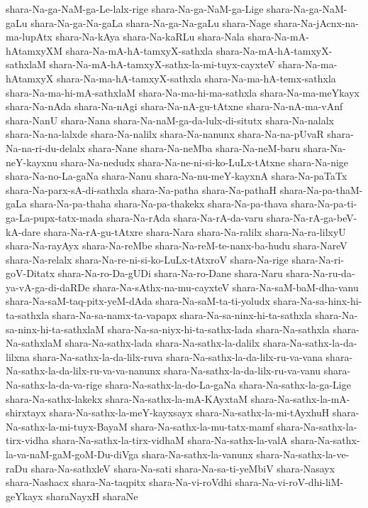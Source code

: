 {shara-Na-ga-NaM-ga-Le-lalx-rige
shara-Na-ga-NaM-ga-Lige
shara-Na-ga-NaM-gaLu
shara-Na-ga-Na-gaLa
shara-Na-ga-Na-gaLu
shara-Nage
shara-Na-jAcnx-na-ma-lupAtx
shara-Na-kAya
shara-Na-kaRLu
shara-Nala
shara-Na-mA-hAtamxyXM
shara-Na-mA-hA-tamxyX-sathxla
shara-Na-mA-hA-tamxyX-sathxlaM
shara-Na-mA-hA-tamxyX-sathx-la-mi-tuyx-cayxteV
shara-Na-ma-hAtamxyX
shara-Na-ma-hA-tamxyX-sathxla
shara-Na-ma-hA-temx-sathxla
shara-Na-ma-hi-mA-sathxlaM
shara-Na-ma-hi-ma-sathxla
shara-Na-ma-meYkayx
shara-Na-nAda
shara-Na-nAgi
shara-Na-nA-gu-tAtxne
shara-Na-nA-ma-vAnf
shara-NanU
shara-Nana
shara-Na-naM-ga-da-lulx-di-situtx
shara-Na-nalalx
shara-Na-na-lalxde
shara-Na-nalilx
shara-Na-nanunx
shara-Na-na-pUvaR
shara-Na-na-ri-du-delalx
shara-Nane
shara-Na-neMba
shara-Na-neM-baru
shara-Na-neY-kayxnu
shara-Na-nedudx
shara-Na-ne-ni-si-ko-LuLx-tAtxne
shara-Na-nige
shara-Na-no-La-gaNa
shara-Nanu
shara-Na-nu-meY-kayxnA
shara-Na-paTaTx
shara-Na-parx-sA-di-sathxla
shara-Na-patha
shara-Na-pathaH
shara-Na-pa-thaM-gaLa
shara-Na-pa-thaha
shara-Na-pa-thakekx
shara-Na-pa-thava
shara-Na-pa-ti-ga-La-pupx-tatx-mada
shara-Na-rAda
shara-Na-rA-da-varu
shara-Na-rA-ga-beV-kA-dare
shara-Na-rA-gu-tAtxre
shara-Nara
shara-Na-ralilx
shara-Na-ra-lilxyU
shara-Na-rayAyx
shara-Na-reMbe
shara-Na-reM-te-nanx-ba-hudu
shara-NareV
shara-Na-relalx
shara-Na-re-ni-si-ko-LuLx-tAtxroV
shara-Na-rige
shara-Na-ri-goV-Ditatx
shara-Na-ro-Da-gUDi
shara-Na-ro-Dane
shara-Naru
shara-Na-ru-da-ya-vA-ga-di-daRDe
shara-Na-sAthx-na-mu-cayxteV
shara-Na-saM-baM-dha-vanu
shara-Na-saM-taq-pitx-yeM-dAda
shara-Na-saM-ta-ti-yoludx
shara-Na-sa-hinx-hi-ta-sathxla
shara-Na-sa-namx-ta-vapapx
shara-Na-sa-ninx-hi-ta-sathxla
shara-Na-sa-ninx-hi-ta-sathxlaM
shara-Na-sa-niyx-hi-ta-sathx-lada
shara-Na-sathxla
shara-Na-sathxlaM
shara-Na-sathx-lada
shara-Na-sathx-la-dalilx
shara-Na-sathx-la-da-lilxna
shara-Na-sathx-la-da-lilx-ruva
shara-Na-sathx-la-da-lilx-ru-va-vana
shara-Na-sathx-la-da-lilx-ru-va-va-nanunx
shara-Na-sathx-la-da-lilx-ru-va-vanu
shara-Na-sathx-la-da-va-rige
shara-Na-sathx-la-do-La-gaNa
shara-Na-sathx-la-ga-Lige
shara-Na-sathx-lakekx
shara-Na-sathx-la-mA-KAyxtaM
shara-Na-sathx-la-mA-shirxtayx
shara-Na-sathx-la-meY-kayxsayx
shara-Na-sathx-la-mi-tAyxhuH
shara-Na-sathx-la-mi-tuyx-BayaM
shara-Na-sathx-la-mu-tatx-mamf
shara-Na-sathx-la-tirx-vidha
shara-Na-sathx-la-tirx-vidhaM
shara-Na-sathx-la-valA
shara-Na-sathx-la-va-naM-gaM-goM-Du-diVga
shara-Na-sathx-la-vanunx
shara-Na-sathx-la-ve-raDu
shara-Na-sathxleV
shara-Na-sati
shara-Na-sa-ti-yeMbiV
shara-Nasayx
shara-Nashacx
shara-Na-taqpitx
shara-Na-vi-roVdhi
shara-Na-vi-roV-dhi-liM-geYkayx
sharaNayxH
sharaNe
}

